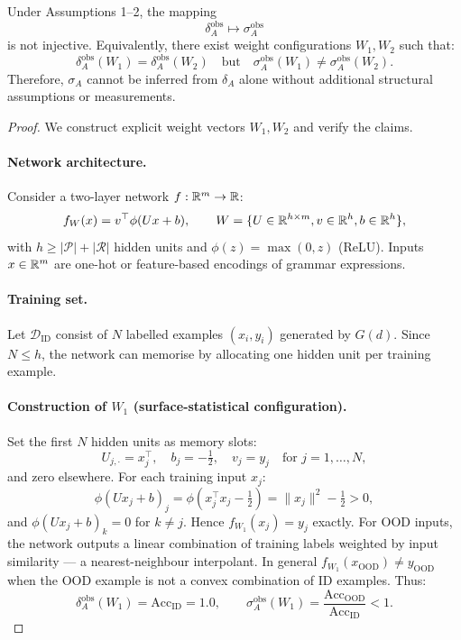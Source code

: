 \begin{lemma}
\label{lemma:latentness}
Under Assumptions 1--2, the mapping
\[
\delta_A^{\text{obs}} \mapsto \sigma_A^{\text{obs}}
\]
is not injective. Equivalently, there exist weight configurations
$W_1, W_2$ such that:
\[
\delta_A^{\text{obs}}(W_1) = \delta_A^{\text{obs}}(W_2)
\quad\text{but}\quad
\sigma_A^{\text{obs}}(W_1) \neq \sigma_A^{\text{obs}}(W_2).
\]
Therefore, $\sigma_A$ cannot be inferred from $\delta_A$ alone without
additional structural assumptions or measurements.
\end{lemma}

\begin{proof}
We construct explicit weight vectors $W_1, W_2$ and verify the claims.

\paragraph{Network architecture.}
Consider a two-layer network $f: \mathbb{R}^m \to \mathbb{R}$:
\[
f_W(x) = v^\top \phi(U x + b), \qquad
W = \{U \in \mathbb{R}^{h \times m}, v \in \mathbb{R}^h, b \in \mathbb{R}^h\},
\]
with $h \geq |\mathcal{P}| + |\mathcal{R}|$ hidden units and
$\phi(z) = \max(0, z)$ (ReLU). Inputs $x \in \mathbb{R}^m$ are one-hot or
feature-based encodings of grammar expressions.

\paragraph{Training set.}
Let $\mathcal{D}_{\text{ID}}$ consist of $N$ labelled examples
$(x_i, y_i)$ generated by $G(d)$. Since $N \leq h$, the network
can memorise by allocating one hidden unit per training example.

\paragraph{Construction of $W_1$ (surface-statistical configuration).}
Set the first $N$ hidden units as memory slots:
\[
U_{j,\cdot} = x_j^\top, \quad b_j = -\tfrac{1}{2}, \quad
v_j = y_j \quad \text{for } j = 1,\dots,N,
\]
and zero elsewhere. For each training input $x_j$:
\[
\phi(U x_j + b)_j = \phi(x_j^\top x_j - \tfrac{1}{2}) = \|x_j\|^2 - \tfrac{1}{2} > 0,
\]
and $\phi(U x_j + b)_k = 0$ for $k \neq j$. Hence $f_{W_1}(x_j) = y_j$
exactly. For OOD inputs, the network outputs a linear combination of
training labels weighted by input similarity --- a nearest-neighbour
interpolant. In general $f_{W_1}(x_{\text{OOD}}) \neq y_{\text{OOD}}$
when the OOD example is not a convex combination of ID examples.
Thus:
\[
\delta_A^{\text{obs}}(W_1) = \text{Acc}_{\text{ID}} = 1.0, \qquad
\sigma_A^{\text{obs}}(W_1) = \frac{\text{Acc}_{\text{OOD}}}{\text{Acc}_{\text{ID}}} < 1.
\]


\end{proof}
